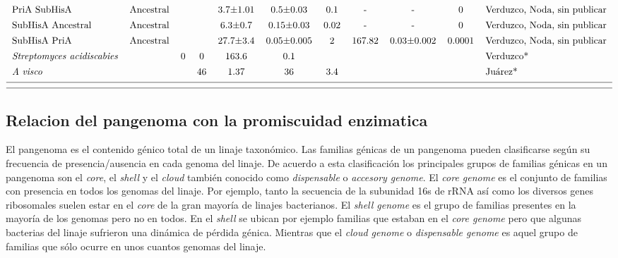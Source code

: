 \documentclass[12pt,twoside]{reedthesis}
\begin{document}
\begin{landscape}
$${\begin{tabular}{ l c r c c c c c c c l}
  PriA SubHisA&Ancestral&&&3.7±1.01&0.5±0.03&0.1&-&-&0&Verduzco, Noda, sin publicar\\ [1ex]    
  SubHisA Ancestral&Ancestral&&&6.3±0.7&0.15±0.03&0.02&-&-&0&Verduzco, Noda, sin publicar\\ [1ex]    
  SubHisA PriA&Ancestral&&&27.7±3.4&0.05±0.005&2&167.82&0.03±0.002&0.0001&Verduzco, Noda, sin publicar\\ [1ex]    
  \textit{Streptomyces} \textit{acidiscabies}&&0&0&163.6&0.1&&&&&Verduzco*\\ [1ex]  
  \textit{A} \textit{visco} &&&46&1.37&36&3.4&&&&Juárez*\\ [1ex]  
  \hline \\ [-1.5ex]
  \hline
  \end{tabular}
  }
  \label{tab:cineticos}  
  $$   
  \end{landscape}
  
  \normalsize
  
  \subsection{Relacion del pangenoma con la promiscuidad
  enzimatica}\label{relacion-del-pangenoma-con-la-promiscuidad-enzimatica}
  
  El pangenoma es el contenido génico total de un linaje taxonómico. Las
  familias génicas de un pangenoma pueden clasificarse según su frecuencia
  de presencia/ausencia en cada genoma del linaje. De acuerdo a esta
  clasificación los principales grupos de familias génicas en un pangenoma
  son el \emph{core}, el \emph{shell} y el \emph{cloud} también conocido
  como \emph{dispensable} o \emph{accesory genome}. El \emph{core genome}
  es el conjunto de familias con presencia en todos los genomas del
  linaje. Por ejemplo, tanto la secuencia de la subunidad 16s de rRNA así
  como los diversos genes ribosomales suelen estar en el \emph{core} de la
  gran mayoría de linajes bacterianos. El \emph{shell genome} es el grupo
  de familias presentes en la mayoría de los genomas pero no en todos. En
  el \emph{shell} se ubican por ejemplo familias que estaban en el
  \emph{core genome} pero que algunas bacterias del linaje sufrieron una
  dinámica de pérdida génica. Mientras que el \emph{cloud genome} o
  \emph{dispensable genome} es aquel grupo de familias que sólo ocurre en
  unos cuantos genomas del linaje.
  
\end{document}
